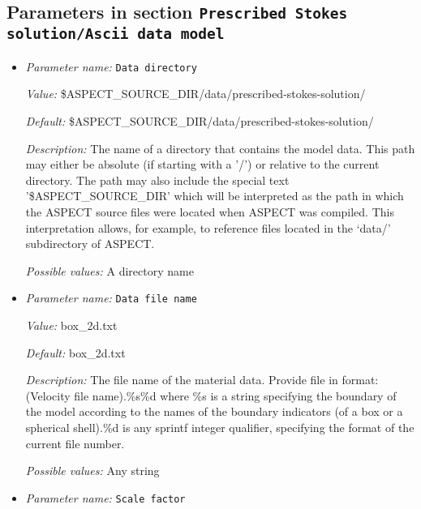 \subsection{Parameters in section \tt Prescribed Stokes solution/Ascii data model}
\label{parameters:Prescribed_20Stokes_20solution/Ascii_20data_20model}

\begin{itemize}
\item {\it Parameter name:} {\tt Data directory}
\label{parameters:Prescribed Stokes solution/Ascii data model/Data directory}


{\it Value:} \$ASPECT\_SOURCE\_DIR/data/prescribed-stokes-solution/


{\it Default:} \$ASPECT\_SOURCE\_DIR/data/prescribed-stokes-solution/


{\it Description:} The name of a directory that contains the model data. This path may either be absolute (if starting with a '/') or relative to the current directory. The path may also include the special text '\$ASPECT\_SOURCE\_DIR' which will be interpreted as the path in which the ASPECT source files were located when ASPECT was compiled. This interpretation allows, for example, to reference files located in the `data/' subdirectory of ASPECT. 


{\it Possible values:} A directory name
\item {\it Parameter name:} {\tt Data file name}
\label{parameters:Prescribed Stokes solution/Ascii data model/Data file name}


{\it Value:} box\_2d.txt


{\it Default:} box\_2d.txt


{\it Description:} The file name of the material data. Provide file in format: (Velocity file name).\%s\%d where \%s is a string specifying the boundary of the model according to the names of the boundary indicators (of a box or a spherical shell).\%d is any sprintf integer qualifier, specifying the format of the current file number. 


{\it Possible values:} Any string
\item {\it Parameter name:} {\tt Scale factor}
\label{parameters:Prescribed Stokes solution/Ascii data model/Scale factor}



\end{itemize}
